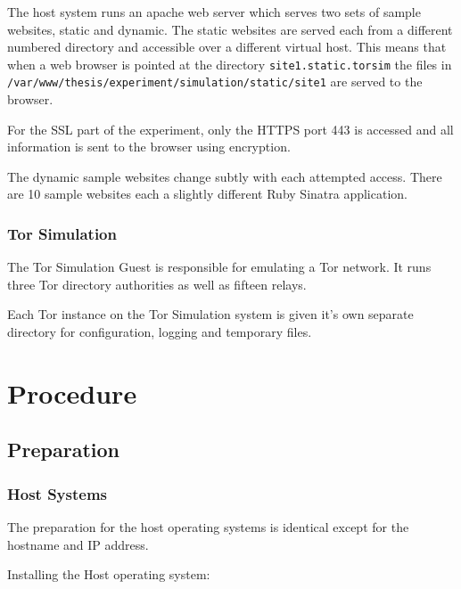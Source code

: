 The host system runs an apache web server which serves two sets of sample
websites, static and dynamic. The static websites are served each from a
different numbered directory and accessible over a different virtual host. This
means that when a web browser is pointed at the directory
\verb+site1.static.torsim+ the files in
\verb+/var/www/thesis/experiment/simulation/static/site1+ are served to the
browser.

For the SSL part of the experiment, only the HTTPS port 443 is accessed and all
information is sent to the browser using encryption.

The dynamic sample websites change subtly with each attempted access. There are
10 sample websites each a slightly different Ruby Sinatra application.

\subsubsection{Tor Simulation}

The Tor Simulation Guest is responsible for emulating a Tor network. It runs
three Tor directory authorities as well as fifteen relays.

Each Tor instance on the Tor Simulation system is given it's own separate
directory for configuration, logging and temporary files.

\section{Procedure}

\subsection{Preparation}

\subsubsection{Host Systems}

The preparation for the host operating systems is identical except for the
hostname and IP address.

Installing the Host operating system:

